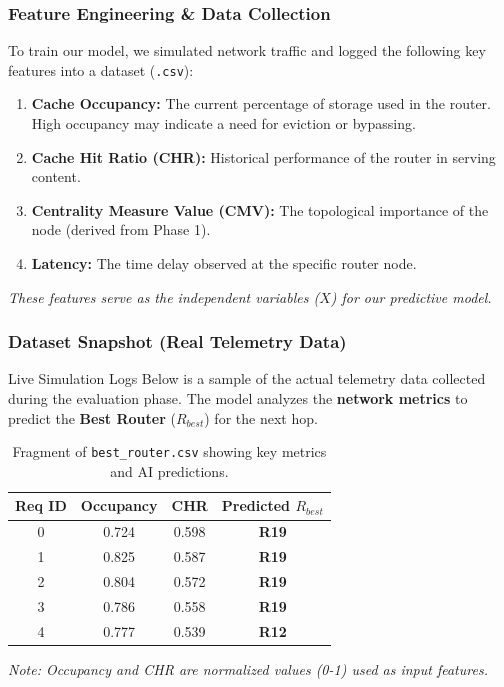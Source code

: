 \documentclass{beamer}
\begin{document}
\begin{frame}
  \frametitle{Feature Engineering \& Data Collection}
  To train our model, we simulated network traffic and logged the following key features into a dataset (\texttt{.csv}):

  \begin{enumerate}
      \item \textbf{Cache Occupancy:} The current percentage of storage used in the router. High occupancy may indicate a need for eviction or bypassing.
      \item \textbf{Cache Hit Ratio (CHR):} Historical performance of the router in serving content.
      \item \textbf{Centrality Measure Value (CMV):} The topological importance of the node (derived from Phase 1).
      \item \textbf{Latency:} The time delay observed at the specific router node.
  \end{enumerate}
  
  \vspace{0.5cm}
  \textit{\small These features serve as the independent variables ($X$) for our predictive model.}
\end{frame}

\begin{frame}
  \frametitle{Dataset Snapshot (Real Telemetry Data)}
  \begin{block}{Live Simulation Logs}
    Below is a sample of the actual telemetry data collected during the evaluation phase. 
    The model analyzes the \textbf{network metrics} to predict the \textbf{Best Router} ($R_{best}$) for the next hop.
  \end{block}

  \begin{table}
    \centering
    \footnotesize
    \renewcommand{\arraystretch}{1.3}
    \begin{tabular}{c c c c}
      \toprule
      \textbf{Req ID} & \textbf{Occupancy} & \textbf{CHR} & \textbf{Predicted $R_{best}$} \\
      \midrule
      0 & 0.724 & 0.598 & \textbf{R19} \\
      1 & 0.825 & 0.587 & \textbf{R19} \\
      2 & 0.804 & 0.572 & \textbf{R19} \\
      3 & 0.786 & 0.558 & \textbf{R19} \\
      4 & 0.777 & 0.539 & \textbf{R12} \\
      \bottomrule
    \end{tabular}
    \caption{Fragment of \texttt{best\_router.csv} showing key metrics and AI predictions.}
  \end{table}
  
  \vspace{0.2cm}
  \textit{\small Note: Occupancy and CHR are normalized values (0-1) used as input features.}
\end{frame}
\end{document}
